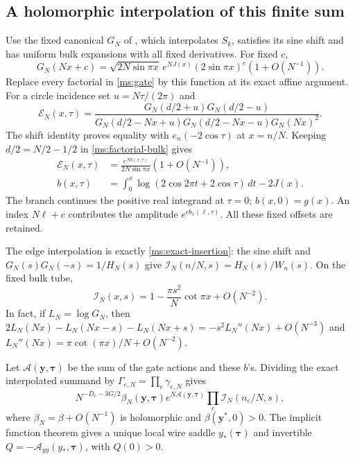 \subsection{A holomorphic interpolation of this finite sum}
Use the fixed canonical $G_N$ of \cite[Lemma 2.1]{Asymptotics},
which interpolates $S_k$, satisfies its sine shift and has uniform
bulk expansions with all fixed derivatives. For fixed $c$,
\begin{equation}\label{ms:factorial-bulk}
 G_N(Nx+c)=\sqrt{2N\sin\pi x}\,e^{NJ(x)}
              (2\sin\pi x)^c(1+O(N^{-1})).
\end{equation}
Replace every factorial in \eqref{ms:gate} by this function at
its exact affine argument. For a circle incidence set
$u=N\tau/(2\pi)$ and
\begin{equation}\label{ms:circle-interpolant}
 \mathcal E_N(x,\tau)=
 \frac{G_N(d/2+u)G_N(d/2-u)}
 {G_N(d/2-Nx+u)G_N(d/2-Nx-u)G_N(Nx)^2}.
\end{equation}
The shift identity proves equality with $e_n(-2\cos\tau)$ at
$x=n/N$. Keeping $d/2=N/2-1/2$ in
\eqref{ms:factorial-bulk} gives
\begin{align}
 \mathcal E_N(x,\tau)&=
   \frac{e^{Nb(x,\tau)}}{2N\sin\pi x}(1+O(N^{-1})),\label{ms:circle-bulk}\\
 b(x,\tau)&=\int_0^x\log(2\cos2\pi t+2\cos\tau)\,dt-2J(x).
\end{align}
The branch continues the positive real integrand at $\tau=0$;
$b(x,0)=g(x)$. An index $N\ell+c$ contributes the amplitude
$e^{c b_x(\ell,\tau)}$. All these fixed offsets are retained.

The edge interpolation is exactly \eqref{ms:exact-insertion}:
the sine shift and $G_N(s)G_N(-s)=1/H_N(s)$ give
$\mathcal I_N(n/N,s)=H_N(s)/W_n(s)$. On the fixed bulk tube,
\begin{equation}\label{ms:insertion-first}
 \mathcal I_N(x,s)=1-\frac{\pi s^2}{N}\cot\pi x+O(N^{-2}).
\end{equation}
In fact, if $L_N=\log G_N$, then
$2L_N(Nx)-L_N(Nx-s)-L_N(Nx+s)
=-s^2L_N''(Nx)+O(N^{-3})$ and
$L_N''(Nx)=\pi\cot(\pi x)/N+O(N^{-2})$.

Let $\mathcal A(\mathbf y,\boldsymbol\tau)$ be the sum of the
gate actions and these $b$'s. Dividing the exact interpolated
summand by $\Gamma_{e,N}=\prod_e\gamma_{e,N}$ gives
\begin{equation}\label{ms:summand}
 N^{-D_c-3G/2}\beta_N(\mathbf y,\boldsymbol\tau)
 e^{N\mathcal A(\mathbf y,\boldsymbol\tau)}
                   \prod_e\mathcal I_N(n_e/N,s),
\end{equation}
where $\beta_N=\beta+O(N^{-1})$ is holomorphic and
$\beta(\mathbf y^*,0)>0$. The implicit function theorem gives a
unique local wire saddle $y_*(\boldsymbol\tau)$ and invertible
$Q=-\mathcal A_{yy}(y_*,\boldsymbol\tau)$, with $Q(0)>0$.

